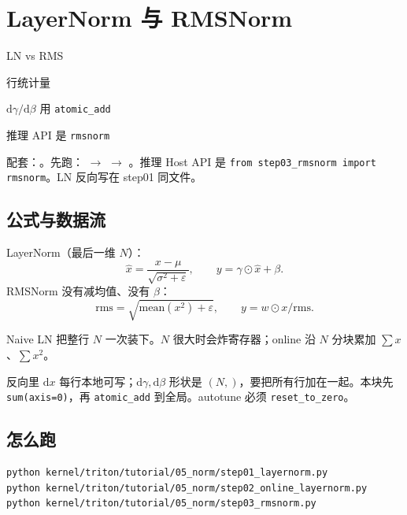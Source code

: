 \chapter{LayerNorm 与 RMSNorm}

\begin{introduction}
  \item LN vs RMS
  \item 行统计量
  \item $\mathrm{d}\gamma/\mathrm{d}\beta$ 用 \texttt{atomic\_add}
  \item 推理 API 是 \texttt{rmsnorm}
\end{introduction}

配套：。先跑： $\to$  $\to$ 。推理 Host API 是 \texttt{from step03\_rmsnorm import rmsnorm}。LN 反向写在 step01 同文件。

\section{公式与数据流}

LayerNorm（最后一维 $N$）：
\[
\hat x=\frac{x-\mu}{\sqrt{\sigma^2+\varepsilon}},\qquad
y=\gamma\odot\hat x+\beta.
\]
RMSNorm 没有减均值、没有 $\beta$：
\[
\mathrm{rms}=\sqrt{\mathrm{mean}(x^2)+\varepsilon},\qquad
y=w\odot x/\mathrm{rms}.
\]

Naive LN 把整行 $N$ 一次装下。$N$ 很大时会炸寄存器；online 沿 $N$ 分块累加 $\sum x$、$\sum x^2$。

\fignorm


反向里 $\mathrm{d}x$ 每行本地可写；$\mathrm{d}\gamma,\mathrm{d}\beta$ 形状是 $(N,)$，要把所有行加在一起。本块先 \texttt{sum(axis=0)}，再 \texttt{atomic\_add} 到全局。autotune 必须 \texttt{reset\_to\_zero}。


\section{怎么跑}

\begin{runcmd}
\begin{lstlisting}[style=shell]
python kernel/triton/tutorial/05_norm/step01_layernorm.py
python kernel/triton/tutorial/05_norm/step02_online_layernorm.py
python kernel/triton/tutorial/05_norm/step03_rmsnorm.py
\end{lstlisting}
\end{runcmd}

